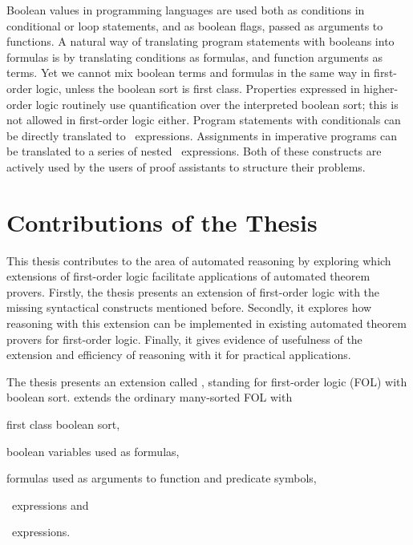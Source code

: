 {Boolean values in programming languages are used both as conditions in conditional or loop statements, and as boolean flags, passed as arguments to functions. A natural way of translating program statements with booleans into formulas is by translating conditions as formulas, and function arguments as terms. Yet we cannot mix boolean terms and formulas in the same way in first-order logic, unless the boolean sort is first class. Properties expressed in higher-order logic routinely use quantification over the interpreted boolean sort; this is not allowed in first-order logic either. Program statements with conditionals can be directly translated to \ITE\ expressions. Assignments in imperative programs can be translated to a series of nested \LETIN\ expressions. Both of these constructs are actively used by the users of proof assistants to structure their problems. %
}

\section*{Contributions of the Thesis}
\label{sect:intro:contributions}
This thesis contributes to the area of automated reasoning by exploring which extensions of first-order logic facilitate applications of automated theorem provers. Firstly, the thesis presents an extension of first-order logic with the missing syntactical constructs mentioned before. Secondly, it explores how reasoning with this extension can be implemented in existing automated theorem provers for first-order logic. Finally, it gives evidence of usefulness of the extension and efficiency of reasoning with it for practical applications.


The thesis presents an extension called \folb{}, standing for first-order logic (FOL) with boolean sort. \folb{} extends the ordinary many-sorted FOL with \begin{enumerate*}[label=(\roman*)]\item first class boolean sort, \item boolean variables used as formulas, \item formulas used as arguments to function and predicate symbols, \item \ITE\ expressions and \item \LETIN\ expressions.\end{enumerate*}

